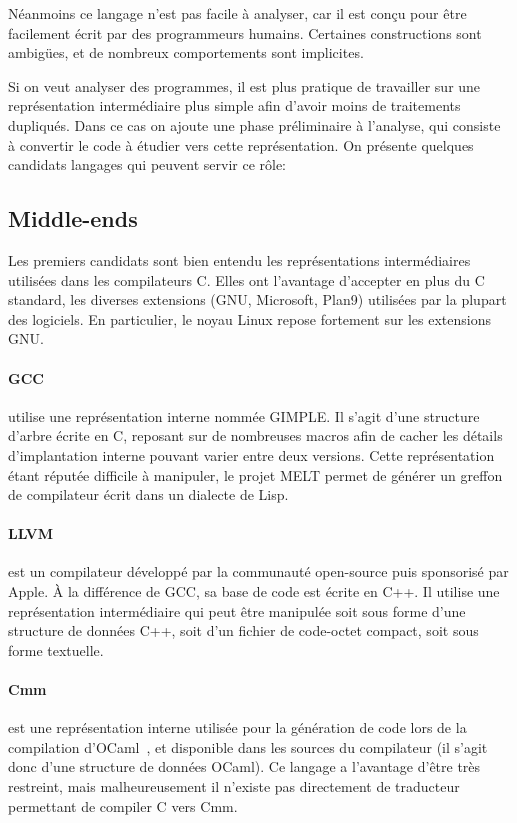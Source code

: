 Néanmoins ce langage n'est pas facile à analyser, car il est conçu pour être
facilement écrit par des programmeurs humains. Certaines constructions sont
ambigües, et de nombreux comportements sont implicites.

Si on veut analyser des programmes, il est plus pratique de travailler sur une
représentation intermédiaire plus simple afin d'avoir moins de traitements
dupliqués. Dans ce cas on ajoute une phase préliminaire à l'analyse, qui
consiste à convertir le code à étudier vers cette représentation. On présente
quelques candidats langages qui peuvent servir ce rôle:

\subsection*{Middle-ends}

Les premiers candidats sont bien entendu les représentations intermédiaires
utilisées dans les compilateurs C. Elles ont l'avantage d'accepter en plus du C
standard, les diverses extensions (GNU, Microsoft, Plan9) utilisées par la
plupart des logiciels. En particulier, le noyau Linux repose fortement sur les
extensions GNU.\@

\paragraph{GCC} utilise une représentation interne nommée
GIMPLE\cite{gcc-gimple}. Il s'agit d'une structure d'arbre écrite en C, reposant
sur de nombreuses macros afin de cacher les détails d'implantation interne
pouvant varier entre deux versions. Cette représentation étant réputée difficile
à manipuler, le projet MELT\cite{gcc-melt} permet de générer un greffon de
compilateur écrit dans un dialecte de Lisp.

\paragraph{LLVM}\cite{llvm-pres} est un compilateur développé par la communauté
open-source puis sponsorisé par Apple. À la différence de GCC, sa base de code
est écrite en C++. Il utilise une représentation intermédiaire qui peut être
manipulée soit sous forme d'une structure de données C++, soit d'un fichier de
code-octet compact, soit sous forme textuelle.

\paragraph{Cmm} est une représentation interne utilisée pour la génération de
code lors de la compilation d'OCaml~, et disponible dans les sources
du compilateur (il s'agit donc d'une structure de données OCaml). Ce langage a
l'avantage d'être très restreint, mais malheureusement il n'existe pas
directement de traducteur permettant de compiler C vers Cmm.


